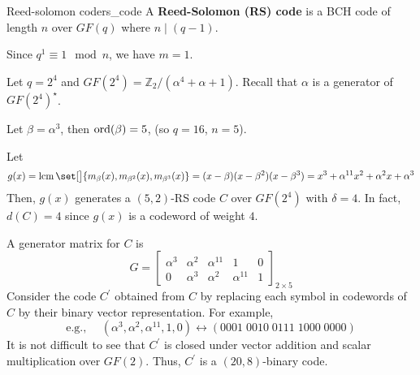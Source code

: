 \begin{figure}[!htbp]
\end{figure}

\begin{Definition}{Reed-solomon code}{rs_code}
    A \textbf{Reed-Solomon (RS) code} is a BCH code
    of length $ n $ over $ GF(q) $ where $ n\mid (q-1) $.
    \begin{Remark}{}{}
        Since $ q^1 \equiv 1\mod n $, we have $ m=1 $.
    \end{Remark}
\end{Definition}

\begin{Example}{}{}
    Let $ q=2^4 $ and $ GF(2^4)=\mathbb{Z}_2/(\alpha^4+\alpha+1) $.
    Recall that $ \alpha $ is a generator of $ GF(2^4)^\star $.

    Let $ \beta=\alpha^3 $, then $ \operatorname{ord}(\beta)=5 $, (so $ q=16 $, $ n=5 $).

    Let
    \[ g(x)=\lcm \set[\big]{m_{\beta}(x),m_{\beta^2}(x),m_{\beta^3}(x)}
        =(x-\beta)(x-\beta^2)(x-\beta^3)
        =x^3+\alpha^{11}x^2+\alpha^2x+\alpha^3 \]
    Then, $ g(x) $ generates a $ (5,2) $-RS code $ C $ over $ GF(2^4) $
    with $ \delta=4 $. In fact, $ d(C)=4 $ since $ g(x) $
    is a codeword of weight $ 4 $.

    A generator matrix for $ C $ is
    \[ G=
        \begin{bmatrix}
            \alpha^3 & \alpha^2 & \alpha^{11} & 1           & 0 \\
            0        & \alpha^3 & \alpha^2    & \alpha^{11} & 1
        \end{bmatrix}_{2\times 5} \]
    Consider the code $ C^{\prime} $ obtained from $ C $
    by replacing each symbol in codewords of $ C $ by their binary vector representation.
    For example,
    \[ \text{e.g., }\quad(\alpha^3,\alpha^2,\alpha^{11},1,0)\longleftrightarrow (0001\; 0010\; 0111\; 1000\; 0000) \]
    It is not difficult to see that $ C^{\prime} $ is closed under vector addition and scalar
    multiplication over $ GF(2) $. Thus, $ C^{\prime} $ is a $ (20,8) $-binary code.
\end{Example}

